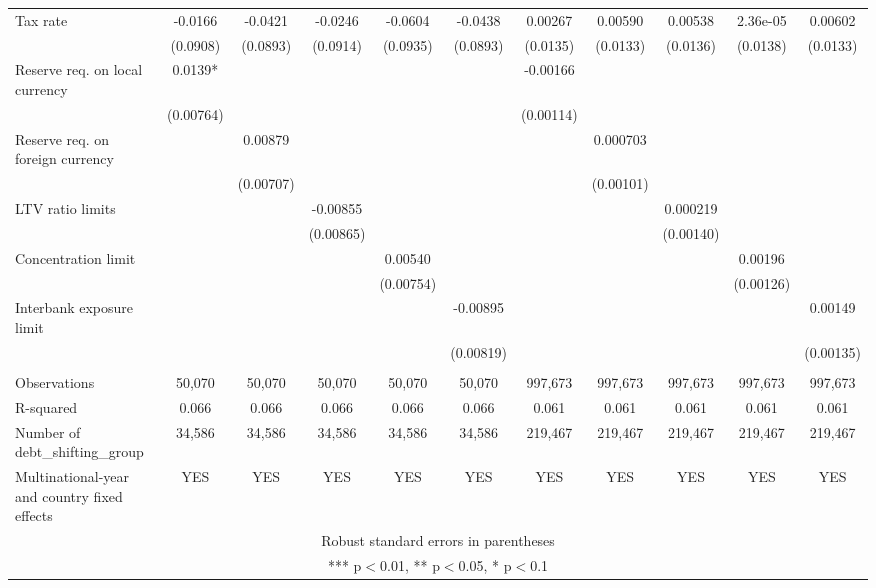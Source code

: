 \begin{tabular}{lcccccccccc}
Tax rate & -0.0166 & -0.0421 & -0.0246 & -0.0604 & -0.0438 & 0.00267 & 0.00590 & 0.00538 & 2.36e-05 & 0.00602 \\
 & (0.0908) & (0.0893) & (0.0914) & (0.0935) & (0.0893) & (0.0135) & (0.0133) & (0.0136) & (0.0138) & (0.0133) \\
Reserve req. on local currency & 0.0139* &  &  &  &  & -0.00166 &  &  &  &  \\
 & (0.00764) &  &  &  &  & (0.00114) &  &  &  &  \\
Reserve req. on foreign currency &  & 0.00879 &  &  &  &  & 0.000703 &  &  &  \\
 &  & (0.00707) &  &  &  &  & (0.00101) &  &  &  \\
LTV ratio limits &  &  & -0.00855 &  &  &  &  & 0.000219 &  &  \\
 &  &  & (0.00865) &  &  &  &  & (0.00140) &  &  \\
Concentration limit &  &  &  & 0.00540 &  &  &  &  & 0.00196 &  \\
 &  &  &  & (0.00754) &  &  &  &  & (0.00126) &  \\
Interbank exposure limit &  &  &  &  & -0.00895 &  &  &  &  & 0.00149 \\
 &  &  &  &  & (0.00819) &  &  &  &  & (0.00135) \\
 &  &  &  &  &  &  &  &  &  &  \\
Observations & 50,070 & 50,070 & 50,070 & 50,070 & 50,070 & 997,673 & 997,673 & 997,673 & 997,673 & 997,673 \\
R-squared & 0.066 & 0.066 & 0.066 & 0.066 & 0.066 & 0.061 & 0.061 & 0.061 & 0.061 & 0.061 \\
Number of debt\_shifting\_group & 34,586 & 34,586 & 34,586 & 34,586 & 34,586 & 219,467 & 219,467 & 219,467 & 219,467 & 219,467 \\
 Multinational-year and country fixed effects & YES & YES & YES & YES & YES & YES & YES & YES & YES & YES \\ \hline
\multicolumn{11}{c}{ Robust standard errors in parentheses} \\
\multicolumn{11}{c}{ *** p$<$0.01, ** p$<$0.05, * p$<$0.1} \\
\end{tabular}
